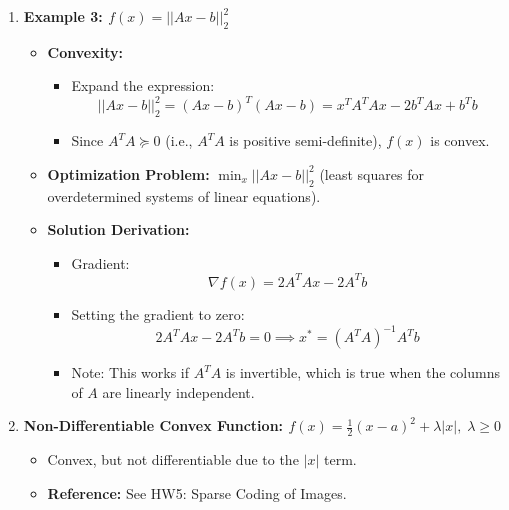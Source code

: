 \begin{example}
\begin{enumerate}
        \item \textbf{Example 3: \( f(x) = ||Ax - b||_2^2 \)}
        \begin{itemize}
            \item \textbf{Convexity:}
            \begin{itemize}
                \item Expand the expression: 
                \[
                ||Ax - b||_2^2 = (Ax - b)^T (Ax - b) = x^T A^T A x - 2b^T A x + b^T b
                \]
                \item Since \( A^T A \succeq 0 \) (i.e., \( A^T A \) is positive semi-definite), \( f(x) \) is convex.
            \end{itemize}
        
            \item \textbf{Optimization Problem:} 
            \(\min_x ||Ax - b||_2^2\) (least squares for overdetermined systems of linear equations).
        
            \item \textbf{Solution Derivation:}
            \begin{itemize}
                \item Gradient: 
                \[
                \nabla f(x) = 2A^T A x - 2A^T b
                \]
                \item Setting the gradient to zero: 
                \[
                2A^T A x - 2A^T b = 0 \implies x^* = (A^T A)^{-1} A^T b
                \]
                \item Note: This works if \( A^T A \) is invertible, which is true when the columns of \( A \) are linearly independent.
            \end{itemize}
        \end{itemize}
        
        \item \textbf{Non-Differentiable Convex Function: \( f(x) = \frac{1}{2} (x - a)^2 + \lambda |x|, \; \lambda \geq 0 \)}
        \begin{itemize}
            \item Convex, but not differentiable due to the \( |x| \) term.
            \item \textbf{Reference:} See HW5: Sparse Coding of Images.
        \end{itemize}
    \end{enumerate}
\end{example}









